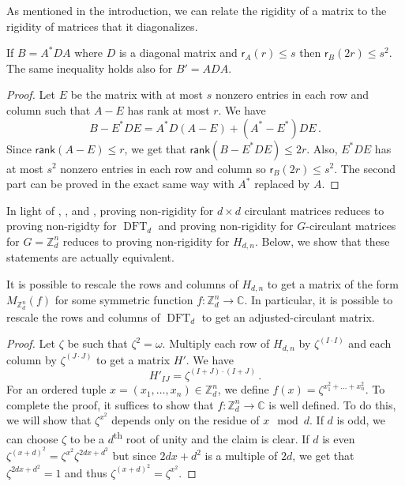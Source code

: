 \documentclass{toc}
\renewcommand\Z{{\mathbb{Z}}}
\renewcommand\C{{\mathbb{C}}}
\newcommand\rank{\textsf{rank}}
\newcommand{\ts}{\textsuperscript}
\DeclareMathOperator{\DFT}{DFT}
\begin{document}
As mentioned in the introduction, we can relate the rigidity of a matrix to the rigidity of matrices  that it diagonalizes.
\begin{lemma}\label{diagonalization}
If $B = A^*DA$ where $D$ is a diagonal matrix and $\textsf{r}_A(r) \leq s$ then $\textsf{r}_B(2r) \leq s^2$.  The same inequality holds also for $B' = ADA$.
\end{lemma}
\begin{proof}
Let $E$ be the matrix with at most $s$ nonzero entries in each row and column such that $A - E$ has rank at most $r$.  We have
\[
B - E^*DE = A^*D(A - E) + (A^* - E^*)DE \,.
\]
Since $\rank(A - E) \leq r$, %
we get that %
$\rank(B - E^*DE) \leq 2r$.  Also, $E^*DE$ has at most $s^2$ nonzero entries in each row and column so $\textsf{r}_B(2r) \leq s^2$.  The second part can be proved in the exact same way with $A^*$ replaced by $A$.
\end{proof}  
In light of , , and , proving non-rigidity for $d \times d$ circulant matrices reduces to proving non-rigidty for %
$\DFT_d$ %
 and proving non-rigidity for 
%
$G$-circulant    %
matrices for
%
$G=\Z_d^n$  %
reduces to proving non-rigidity for $H_{d,n}$.  Below, we show that these statements are actually equivalent.

\begin{claim}\label{rescaling}
It is possible to rescale the rows and columns of $H_{d,n}$ to get a matrix of the form $M_{\Z_d^n}(f)$ for some symmetric function $f:\Z_d^n \rightarrow \C$.  In particular, it is possible to rescale the rows and columns of %
$\DFT_d$ %
 to get an adjusted-circulant matrix.
\end{claim}
\begin{proof}
Let $\zeta$ be such that $\zeta^2 = \omega$.  Multiply each row of $H_{d,n}$ by $\zeta^{(I \cdot I)}$ and each column by $\zeta^{(J \cdot J)}$ to get a matrix $H'$.  We have
\[
H'_{IJ} = \zeta^{(I+J) \cdot (I+J)} \,.
\]
For an ordered tuple $x = (x_1, \dots , x_n) \in \Z_d^n$, we define $f(x) = \zeta^{x_1^2 + \dots + x_n^2}$.  To complete the proof, it suffices to show that $f: \Z_d^n \rightarrow \C$ is well defined.  To do this, we will show that $\zeta^{x^2}$ depends only on the residue of $x \mod d$.  If $d$ is odd, we can choose $\zeta$ to be a $d$\ts{th} root of unity and the claim is clear.  If $d$ is even $\zeta^{(x+d)^2} = \zeta^{x^2}\zeta^{2dx + d^2}$ but since $2dx + d^2$ is a multiple of $2d$, %
we get that  %
$\zeta^{2dx + d^2} = 1$ and thus $\zeta^{(x+d)^2} = \zeta^{x^2}$.  
\end{proof}
\end{document}
